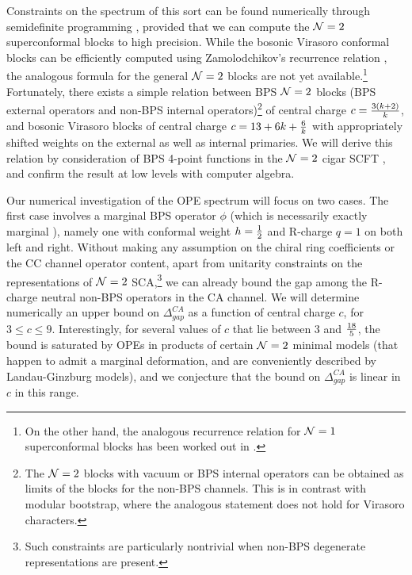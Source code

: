 \documentclass[12pt]{article}
\begin{document}
Constraints on the spectrum of this sort can be found numerically through semidefinite programming \cite{Simmons-Duffin:2015qma}, provided that we can compute the ${\cal N}=2$ superconformal blocks to high precision. While the bosonic Virasoro conformal blocks can be efficiently computed using Zamolodchikov's recurrence relation \cite{zamolodchikov1987conformal}, the analogous formula for the general ${\cal N}=2$ blocks are not yet available.\footnote{On the other hand, the analogous recurrence relation for ${\mathcal N}=1$ superconformal blocks has been worked out in \cite{Belavin:2006zr,Hadasz:2006qb,Hadasz:2008dt}.} Fortunately, there exists a simple relation between BPS ${\cal N}=2$ blocks (BPS external operators and non-BPS internal operators)\footnote{The ${\mathcal N}=2$ blocks with vacuum or BPS internal operators can be obtained as limits of the blocks for the non-BPS channels. This is in contrast with modular bootstrap, where the analogous statement does not hold for Virasoro characters.} of central charge $c={3(k+2)\over k}$, and bosonic Virasoro blocks of central charge $c=13+6k+{6\over k}$ with appropriately shifted weights on the external as well as internal primaries. We will derive this relation by consideration of BPS 4-point functions in the ${\cal N}=2$ cigar SCFT \cite{Ooguri:1995wj, Giveon:1999px, Aharony:2003vk, Aharony:2004xn,Chang:2014jta}, and confirm the result at low levels with computer algebra. 


Our numerical investigation of the OPE spectrum will focus on two cases. The first case involves a marginal BPS operator $\phi$ (which is necessarily exactly marginal \cite{Dixon:1987bg,Seiberg:1988pf}), namely one with conformal weight $h={1\over 2}$ and R-charge $q=1$ on both left and right. Without making any assumption on the chiral ring coefficients or the CC channel operator content, apart from unitarity constraints on the representations of ${\cal N}=2$ SCA,\footnote{Such constraints are particularly nontrivial when non-BPS degenerate representations are present.} we can already bound  the gap among the R-charge  neutral non-BPS operators in the CA channel. We will determine numerically an upper bound on $\Delta_{gap}^{CA}$ as a function of central charge $c$, for $3\leq c\leq 9$. Interestingly, for several values of $c$ that lie between 3 and ${18\over 5}$, the bound is saturated by OPEs in products of certain ${\cal N}=2$ minimal models (that happen to admit a marginal deformation, and are conveniently described by Landau-Ginzburg models), and we conjecture that the bound on $\Delta_{gap}^{CA}$ is linear in $c$ in this range.
\end{document}
